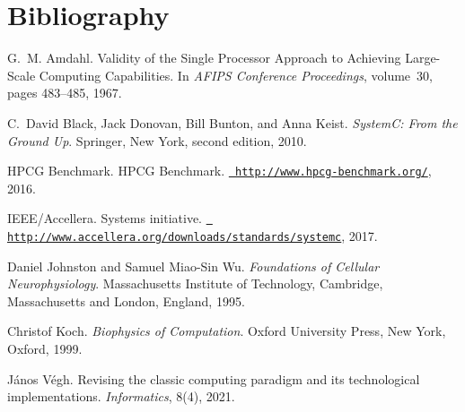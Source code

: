 \chapter{Bibliography}
\hypertarget{citelist}{}\label{citelist}

\begin{DoxyDescription}
\item[\label{citelist_CITEREF_AmdahlSingleProcessor67}%
\Hypertarget{citelist_CITEREF_AmdahlSingleProcessor67}%
\mbox{[}1\mbox{]}]G.~M. Amdahl. Validity of the Single Processor Approach to Achieving Large-\/\+Scale Computing Capabilities. In {\itshape AFIPS Conference Proceedings}, volume~30, pages 483--485, 1967. 


\item[\label{citelist_CITEREF_SystemCBook:2010}%
\Hypertarget{citelist_CITEREF_SystemCBook:2010}%
\mbox{[}2\mbox{]}]C.~David Black, Jack Donovan, Bill Bunton, and Anna Keist. {\itshape SystemC\+: From the Ground Up}. Springer, New York, second edition, 2010.


\item[\label{citelist_CITEREF_HPCG_List:2016}%
\Hypertarget{citelist_CITEREF_HPCG_List:2016}%
\mbox{[}3\mbox{]}]HPCG Benchmark. HPCG Benchmark. \href{http://www.hpcg-benchmark.org/}{\texttt{ http\+://www.\+hpcg-\/benchmark.\+org/}}, 2016.


\item[\label{citelist_CITEREF_SystemChome:2017}%
\Hypertarget{citelist_CITEREF_SystemChome:2017}%
\mbox{[}4\mbox{]}]IEEE/\+Accellera. Systems initiative. \href{http://www.accellera.org/downloads/standards/systemc}{\texttt{ http\+://www.\+accellera.\+org/downloads/standards/systemc}}, 2017.


\item[\label{citelist_CITEREF_JohnstonWuNeurophysiology:1995}%
\Hypertarget{citelist_CITEREF_JohnstonWuNeurophysiology:1995}%
\mbox{[}5\mbox{]}]Daniel Johnston and Samuel Miao-\/\+Sin Wu. {\itshape Foundations of Cellular Neurophysiology}. Massachusetts Institute of Technology, Cambridge, Massachusetts and London, England, 1995.


\item[\label{citelist_CITEREF_KochBiophysics:1999}%
\Hypertarget{citelist_CITEREF_KochBiophysics:1999}%
\mbox{[}6\mbox{]}]Christof Koch. {\itshape Biophysics of Computation}. Oxford University Press, New York, Oxford, 1999.


\item[\label{citelist_CITEREF_VeghRevisingClassicComputing:2021}%
\Hypertarget{citelist_CITEREF_VeghRevisingClassicComputing:2021}%
\mbox{[}7\mbox{]}]J\'{a}nos V\'{e}gh. Revising the classic computing paradigm and its technological implementations. {\itshape Informatics}, 8(4), 2021. 


\end{DoxyDescription}